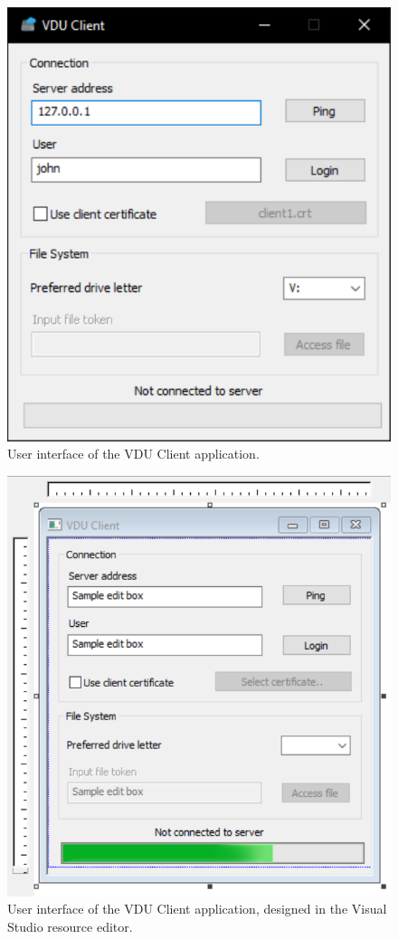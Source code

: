 \begin{figure}[htb]
    \centering
    \includegraphics[]{obrazky-figures/clientui.pdf}
	\caption{User interface of the VDU Client application.}
	\label{clientui}
\end{figure}

\begin{figure}[htb]
    \centering
    \includegraphics[]{obrazky-figures/resourceeditorui.pdf}
	\caption{User interface of the VDU Client application, designed in the Visual Studio resource editor.}
	\label{resourceeditorui}
\end{figure}

